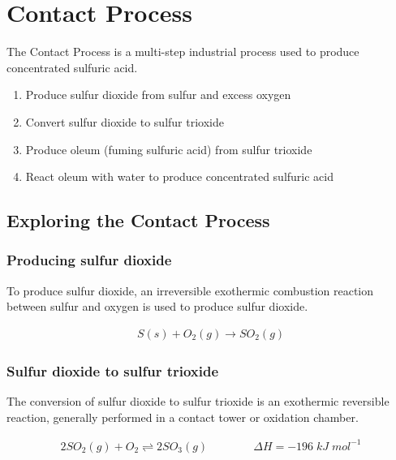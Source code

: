 \documentclass[12pt, a4paper]{article}
\begin{document}
\maketitle





\section{Contact Process}

The Contact Process is a multi-step industrial process used to produce concentrated sulfuric acid. 

\begin{enumerate}
	\item Produce sulfur dioxide from sulfur and excess oxygen
	\item Convert sulfur dioxide to sulfur trioxide
	\item Produce oleum (fuming sulfuric acid) from sulfur trioxide
	\item React oleum with water to produce concentrated sulfuric acid
\end{enumerate}






\subsection{Exploring the Contact Process}

\subsubsection{Producing sulfur dioxide}

To produce sulfur dioxide, an irreversible exothermic combustion reaction between sulfur and oxygen is used to produce sulfur dioxide.

\begin{align}
	S(s) + O_{2}(g) \rightarrow SO_{2}(g)
\end{align}

\subsubsection{Sulfur dioxide to sulfur trioxide}

The conversion of sulfur dioxide to sulfur trioxide is an exothermic reversible reaction, generally performed in a contact tower or oxidation chamber.

\begin{align}
	2SO_{2}(g) + O_{2} \rightleftharpoons 2SO_{3}(g) \qquad \qquad \Delta H = -196 \; kJ \; mol^{-1}
\end{align}
\end{document}
